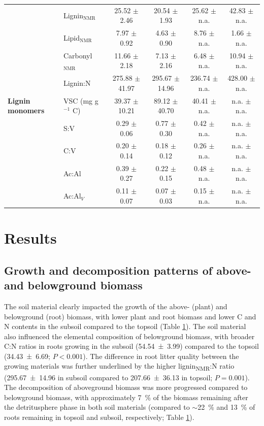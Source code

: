 \begin{table}[htbp]
\begin{tabular}{llcccc}
  & Lignin$_{\text{NMR}}$ & 25.52 $\pm$ 2.46 & 20.54 $\pm$ 1.93 & 25.62 $\pm$ n.a. & 42.83 $\pm$ n.a. \\
  & Lipid$_{\text{NMR}}$ & 7.97 $\pm$ 0.92 & 4.63 $\pm$ 0.90 & 8.76 $\pm$ n.a. & 1.66 $\pm$ n.a. \\
  & Carbonyl$_{\text{NMR}}$ & 11.66 $\pm$ 2.18 & 7.13 $\pm$ 2.16 & 6.48 $\pm$ n.a. & 10.94 $\pm$ n.a. \\
  & Lignin:N & 275.88 $\pm$ 41.97 & 295.67 $\pm$ 14.96 & 236.74 $\pm$ n.a. & 428.00 $\pm$ n.a. \\
  \midrule
  \textbf{Lignin monomers} & VSC (mg g$^{-1}$ C) & 39.37 $\pm$ 10.21 & 89.12 $\pm$ 40.70 & 40.41 $\pm$ n.a. & n.a. $\pm$ n.a. \\
  & S:V & 0.29 $\pm$ 0.06 & 0.77 $\pm$ 0.30 & 0.42 $\pm$ n.a. & n.a. $\pm$ n.a. \\
  & C:V & 0.20 $\pm$ 0.14 & 0.18 $\pm$ 0.12 & 0.26 $\pm$ n.a. & n.a. $\pm$ n.a. \\
  & Ac:Al & 0.39 $\pm$ 0.27 & 0.22 $\pm$ 0.15 & 0.48 $\pm$ n.a. & n.a. $\pm$ n.a. \\
  & Ac:Al$_V$ & 0.11 $\pm$ 0.07 & 0.07 $\pm$ 0.03 & 0.15 $\pm$ n.a. & n.a. $\pm$ n.a. \\
  \bottomrule
  \end{tabular}
  \label{tab:M5-T1}
  \end{table}

\section{Results}
\subsection{Growth and decomposition patterns of above- and belowground
biomass}

The soil material clearly impacted the growth of the above- (plant) and belowground (root) biomass, with lower plant and root biomass and lower C and N contents in the subsoil compared to the topsoil (Table \ref{tab:M5-T1}). The soil material also influenced the elemental composition of belowground biomass, with broader C:N ratios in roots growing in the subsoil (\num{54.54 \pm 3.99}) compared to the topsoil (\num{34.43 \pm 6.69}; \(P < 0.001\)). The difference in root litter quality between the growing materials was further underlined by the higher lignin\textsubscript{NMR}:N ratio (\num{295.67 \pm 14.96} in subsoil compared to \num{207.66 \pm 36.13} in topsoil; \(P= 0.001\)). The decomposition of aboveground biomass was more progressed compared to belowground biomass, with approximately \SI{7}{\percent} of the biomass remaining after the detritusphere phase in both soil materials (compared to \(\sim\)\SI{22}{\percent} and \SI{13}{\percent} of roots remaining in topsoil and subsoil, respectively; Table \ref{tab:M5-T1}).

